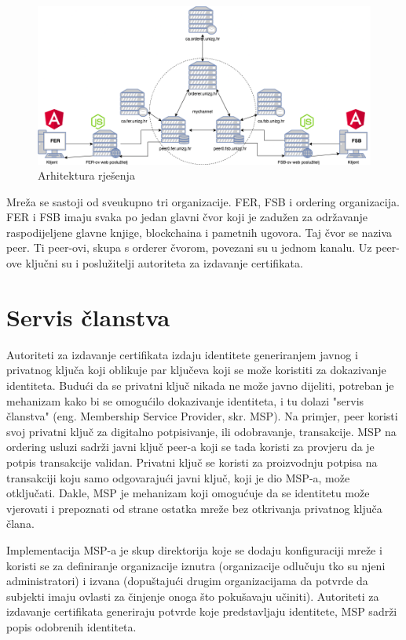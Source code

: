 \documentclass[times, utf8, diplomski]{fer}
\begin{document}
\begin{figure}[htb]
\centering
\includegraphics[scale=0.33]{imgs/Arhitektura.png}
\caption{Arhitektura rješenja}
\label{fig:arhitektura}
\end{figure}

Mreža se sastoji od sveukupno tri organizacije. FER, FSB i ordering organizacija. FER i FSB imaju svaka po jedan glavni čvor koji je zadužen za održavanje raspodijeljene glavne knjige, blockchaina i pametnih ugovora. Taj čvor se naziva peer.  Ti peer-ovi, skupa s orderer čvorom, povezani su u jednom kanalu.  Uz peer-ove ključni su i poslužitelji autoriteta za izdavanje certifikata.

\section{Servis članstva}
Autoriteti za izdavanje certifikata izdaju identitete generiranjem javnog i privatnog ključa koji oblikuje par ključeva koji se može koristiti za dokazivanje identiteta. Budući da se privatni ključ nikada ne može javno dijeliti, potreban je mehanizam kako bi se omogućilo dokazivanje identiteta,  i tu dolazi "servis članstva" (eng. Membership Service Provider, skr. MSP). Na primjer, peer koristi svoj privatni ključ za digitalno potpisivanje, ili odobravanje,  transakcije. MSP na ordering usluzi sadrži javni ključ peer-a koji se tada koristi za provjeru da je potpis transakcije validan. Privatni ključ se koristi za proizvodnju potpisa na transakciji koju samo odgovarajući javni ključ, koji je dio MSP-a,  može otključati.  Dakle, MSP je mehanizam koji omogućuje da se identitetu može vjerovati i prepoznati od strane ostatka mreže bez otkrivanja privatnog ključa člana.

Implementacija MSP-a je skup direktorija koje se dodaju konfiguraciji mreže i koristi se za definiranje organizacije iznutra (organizacije odlučuju tko su njeni administratori) i izvana (dopuštajući drugim organizacijama da potvrde da subjekti imaju ovlasti za činjenje onoga što pokušavaju učiniti). Autoriteti za izdavanje certifikata generiraju potvrde koje predstavljaju identitete,  MSP sadrži popis odobrenih identiteta.
\end{document}
